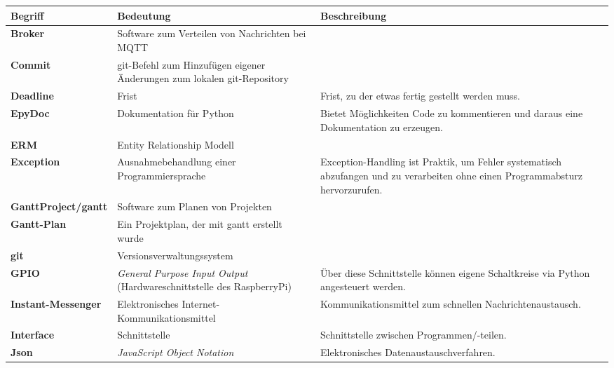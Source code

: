 \documentclass{scrartcl}
\date{}
\begin{document}
\maketitle
\renewcommand{\maketitle}{}
\renewcommand{\tableofcontents}{}

{
\renewcommand*{\arraystretch}{1.5}
\begin{center}
\begin{longtable}{>{\bfseries}l L{.35} L{.4}}
Begriff & Bedeutung & Beschreibung\\\hline
Broker & Software zum Verteilen von Nachrichten bei MQTT\\
Commit& git-Befehl zum Hinzufügen eigener Änderungen zum lokalen git-Repository&\\
Deadline & Frist & Frist, zu der etwas fertig gestellt werden muss.\\
EpyDoc & Dokumentation für Python & Bietet Möglichkeiten Code zu kommentieren und daraus eine Dokumentation zu erzeugen.\\
ERM & Entity Relationship Modell & \\
Exception & Ausnahmebehandlung einer Programmiersprache& Exception-Handling ist Praktik, um Fehler systematisch abzufangen und zu verarbeiten ohne einen Programmabsturz hervorzurufen.\\
GanttProject/gantt & Software zum Planen von Projekten &\\
Gantt-Plan & Ein Projektplan, der mit gantt erstellt wurde\\
git & Versionsverwaltungssystem&\\
GPIO& \emph{General Purpose Input Output} (Hardwareschnittstelle des RaspberryPi)& Über diese Schnittstelle können eigene Schaltkreise via Python angesteuert werden.\\
Instant-Messenger& Elektronisches Internet-Kommunikationsmittel& Kommunikationsmittel zum schnellen Nachrichtenaustausch.\\
Interface & Schnittstelle & Schnittstelle zwischen Programmen/-teilen.\\
Json & \emph{JavaScript Object Notation}& Elektronisches Datenaustauschverfahren.\\

\end{longtable}
\end{center}}
\end{document}
